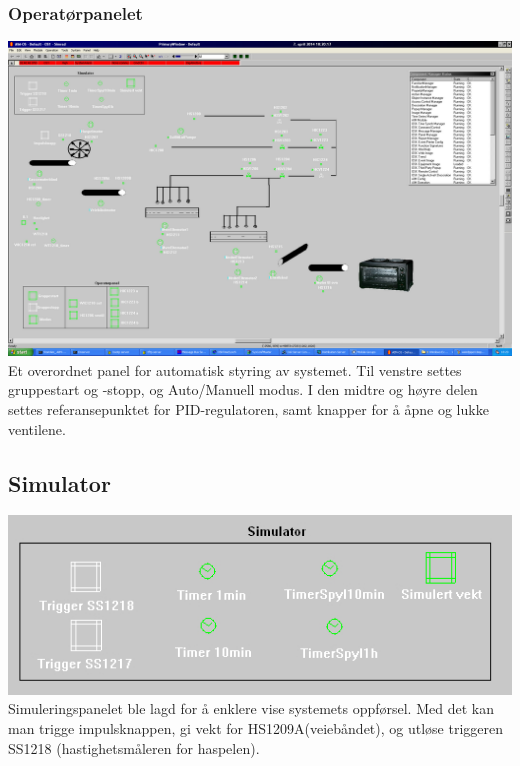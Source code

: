 \subsubsection{Operatørpanelet}
	\includegraphics{op.jpg}
	Et overordnet panel for automatisk styring av systemet. Til venstre settes gruppestart og -stopp, og Auto/Manuell modus. I den midtre og høyre delen settes referansepunktet for PID-regulatoren, samt knapper for å åpne og lukke ventilene.

\subsection{Simulator}
	\includegraphics{simulator.jpg}
	Simuleringspanelet ble lagd for å enklere vise systemets oppførsel. Med det kan man trigge impulsknappen, gi vekt for HS1209A(veiebåndet), og utløse triggeren SS1218 (hastighetsmåleren for haspelen).
